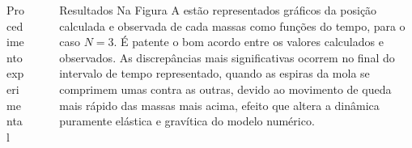 \documentclass[final]{beamer}
\newlength{\sepwidth}
\newlength{\colwidth}
\newcommand{\separatorcolumn}{\begin{column}{\sepwidth}\end{column}}
\begin{document}
\begin{frame}[t]
\begin{columns}[t]
\begin{column}{\colwidth}
\begin{block}{Procedimento experimental}
\end{block}
\end{column}
\separatorcolumn
\begin{column}{\colwidth}
\begin{block}{Resultados}
	Na Figura A estão representados gráficos da posição calculada e observada de
	cada massas como funções do tempo, para o caso $N=3$. É patente o bom acordo
	entre os valores calculados e observados. As discrepâncias mais significativas
	ocorrem no final do intervalo de tempo representado, quando as espiras da mola
	se comprimem umas contra as outras, devido ao movimento de queda mais rápido das
	massas mais acima, efeito que altera a dinâmica puramente elástica e gravítica
	do modelo numérico.
	

\end{block}
\end{column}
\end{columns}
\end{frame}
\end{document}
